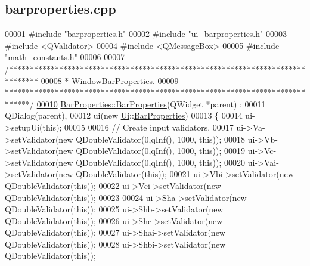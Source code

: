 \hypertarget{barproperties_8cpp_source}{}\subsection{barproperties.\+cpp}
\label{barproperties_8cpp_source}

\begin{DoxyCode}
00001 \textcolor{preprocessor}{#include "\hyperlink{barproperties_8h}{barproperties.h}"}
00002 \textcolor{preprocessor}{#include "ui\_barproperties.h"}
00003 \textcolor{preprocessor}{#include <QValidator>}
00004 \textcolor{preprocessor}{#include <QMessageBox>}
00005 \textcolor{preprocessor}{#include "\hyperlink{math__constants_8h}{math\_constants.h}"}
00006 
00007 \textcolor{comment}{/*******************************************************************************}
00008 \textcolor{comment}{ * WindowBarProperties.}
00009 \textcolor{comment}{ ******************************************************************************/}
\hypertarget{barproperties_8cpp_source_l00010}{}\hyperlink{class_bar_properties_a7c14a54f430cabfe872869799076025b}{00010} \hyperlink{class_bar_properties_a7c14a54f430cabfe872869799076025b}{BarProperties::BarProperties}(QWidget *parent) :
00011   QDialog(parent),
00012   ui(new \hyperlink{namespace_ui}{Ui}::\hyperlink{class_bar_properties}{BarProperties})
00013 \{
00014   ui->setupUi(\textcolor{keyword}{this});
00015 
00016   \textcolor{comment}{// Create input validators.}
00017   ui->Va->setValidator(\textcolor{keyword}{new} QDoubleValidator(0,qInf(), 1000, \textcolor{keyword}{this}));
00018   ui->Vb->setValidator(\textcolor{keyword}{new} QDoubleValidator(0,qInf(), 1000, \textcolor{keyword}{this}));
00019   ui->Vc->setValidator(\textcolor{keyword}{new} QDoubleValidator(0,qInf(), 1000, \textcolor{keyword}{this}));
00020   ui->Vai->setValidator(\textcolor{keyword}{new} QDoubleValidator(\textcolor{keyword}{this}));
00021   ui->Vbi->setValidator(\textcolor{keyword}{new} QDoubleValidator(\textcolor{keyword}{this}));
00022   ui->Vci->setValidator(\textcolor{keyword}{new} QDoubleValidator(\textcolor{keyword}{this}));
00023 
00024   ui->Sha->setValidator(\textcolor{keyword}{new} QDoubleValidator(\textcolor{keyword}{this}));
00025   ui->Shb->setValidator(\textcolor{keyword}{new} QDoubleValidator(\textcolor{keyword}{this}));
00026   ui->Shc->setValidator(\textcolor{keyword}{new} QDoubleValidator(\textcolor{keyword}{this}));
00027   ui->Shai->setValidator(\textcolor{keyword}{new} QDoubleValidator(\textcolor{keyword}{this}));
00028   ui->Shbi->setValidator(\textcolor{keyword}{new} QDoubleValidator(\textcolor{keyword}{this}));

\end{DoxyCode}
